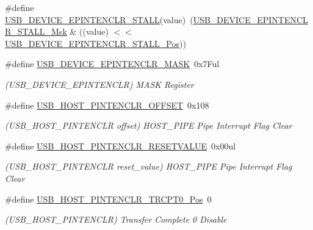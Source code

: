 \begin{DoxyCompactItemize}
\item 
\#define \mbox{\hyperlink{group___s_a_m_d21___u_s_b_ga5dabf4d55682115d290c2781f31d0760}{U\+S\+B\+\_\+\+D\+E\+V\+I\+C\+E\+\_\+\+E\+P\+I\+N\+T\+E\+N\+C\+L\+R\+\_\+\+S\+T\+A\+LL}}(value)~(\mbox{\hyperlink{group___s_a_m_d21___u_s_b_ga12611d5c3f417b9b83f0e13bc1d3e43a}{U\+S\+B\+\_\+\+D\+E\+V\+I\+C\+E\+\_\+\+E\+P\+I\+N\+T\+E\+N\+C\+L\+R\+\_\+\+S\+T\+A\+L\+L\+\_\+\+Msk}} \& ((value) $<$$<$ \mbox{\hyperlink{group___s_a_m_d21___u_s_b_ga35b6164a256415dc81652aa38f381584}{U\+S\+B\+\_\+\+D\+E\+V\+I\+C\+E\+\_\+\+E\+P\+I\+N\+T\+E\+N\+C\+L\+R\+\_\+\+S\+T\+A\+L\+L\+\_\+\+Pos}}))
\item 
\#define \mbox{\hyperlink{group___s_a_m_d21___u_s_b_ga4f401cb3488fd905cc6023234168ec4b}{U\+S\+B\+\_\+\+D\+E\+V\+I\+C\+E\+\_\+\+E\+P\+I\+N\+T\+E\+N\+C\+L\+R\+\_\+\+M\+A\+SK}}~0x7\+Ful
\begin{DoxyCompactList}\small\item\em (U\+S\+B\+\_\+\+D\+E\+V\+I\+C\+E\+\_\+\+E\+P\+I\+N\+T\+E\+N\+C\+LR) M\+A\+SK Register \end{DoxyCompactList}\item 
\#define \mbox{\hyperlink{group___s_a_m_d21___u_s_b_ga8f316a48734cb1038cf55616ab78cff0}{U\+S\+B\+\_\+\+H\+O\+S\+T\+\_\+\+P\+I\+N\+T\+E\+N\+C\+L\+R\+\_\+\+O\+F\+F\+S\+ET}}~0x108
\begin{DoxyCompactList}\small\item\em (U\+S\+B\+\_\+\+H\+O\+S\+T\+\_\+\+P\+I\+N\+T\+E\+N\+C\+LR offset) H\+O\+S\+T\+\_\+\+P\+I\+PE Pipe Interrupt Flag Clear \end{DoxyCompactList}\item 
\#define \mbox{\hyperlink{group___s_a_m_d21___u_s_b_gae6db98830ccbf80ee18667908208a649}{U\+S\+B\+\_\+\+H\+O\+S\+T\+\_\+\+P\+I\+N\+T\+E\+N\+C\+L\+R\+\_\+\+R\+E\+S\+E\+T\+V\+A\+L\+UE}}~0x00ul
\begin{DoxyCompactList}\small\item\em (U\+S\+B\+\_\+\+H\+O\+S\+T\+\_\+\+P\+I\+N\+T\+E\+N\+C\+LR reset\+\_\+value) H\+O\+S\+T\+\_\+\+P\+I\+PE Pipe Interrupt Flag Clear \end{DoxyCompactList}\item 
\#define \mbox{\hyperlink{group___s_a_m_d21___u_s_b_gafac89e47191cfdf2ffe2e994a2ff5924}{U\+S\+B\+\_\+\+H\+O\+S\+T\+\_\+\+P\+I\+N\+T\+E\+N\+C\+L\+R\+\_\+\+T\+R\+C\+P\+T0\+\_\+\+Pos}}~0
\begin{DoxyCompactList}\small\item\em (U\+S\+B\+\_\+\+H\+O\+S\+T\+\_\+\+P\+I\+N\+T\+E\+N\+C\+LR) Transfer Complete 0 Disable \end{DoxyCompactList}\item 
$$
\end{DoxyCompactItemize}

